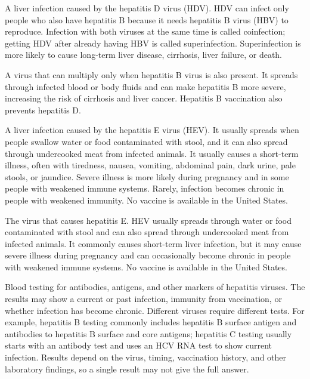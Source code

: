  A liver infection caused by the hepatitis D virus (HDV). HDV can infect only people who also have hepatitis B because it needs hepatitis B virus (HBV) to reproduce. Infection with both viruses at the same time is called coinfection; getting HDV after already having HBV is called superinfection. Superinfection is more likely to cause long-term liver disease, cirrhosis, liver failure, or death.

 A virus that can multiply only when hepatitis B virus is also present. It spreads through infected blood or body fluids and can make hepatitis B more severe, increasing the risk of cirrhosis and liver cancer. Hepatitis B vaccination also prevents hepatitis D.

 A liver infection caused by the hepatitis E virus (HEV). It usually spreads when people swallow water or food contaminated with stool, and it can also spread through undercooked meat from infected animals. It usually causes a short-term illness, often with tiredness, nausea, vomiting, abdominal pain, dark urine, pale stools, or jaundice. Severe illness is more likely during pregnancy and in some people with weakened immune systems. Rarely, infection becomes chronic in people with weakened immunity. No vaccine is available in the United States.

 The virus that causes hepatitis E. HEV usually spreads through water or food contaminated with stool and can also spread through undercooked meat from infected animals. It commonly causes short-term liver infection, but it may cause severe illness during pregnancy and can occasionally become chronic in people with weakened immune systems. No vaccine is available in the United States.

 Blood testing for antibodies, antigens, and other markers of hepatitis viruses. The results may show a current or past infection, immunity from vaccination, or whether infection has become chronic. Different viruses require different tests. For example, hepatitis B testing commonly includes hepatitis B surface antigen and antibodies to hepatitis B surface and core antigens; hepatitis C testing usually starts with an antibody test and uses an HCV RNA test to show current infection. Results depend on the virus, timing, vaccination history, and other laboratory findings, so a single result may not give the full answer.

